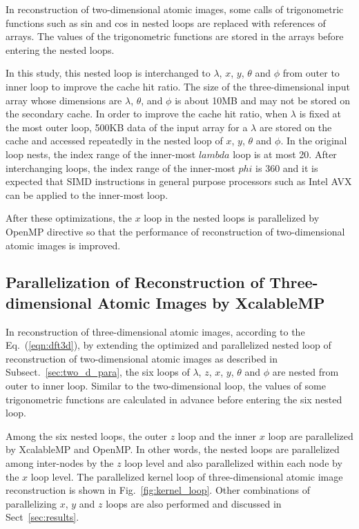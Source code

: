 \documentclass[graybox,vecphys]{svmult}
\begin{document}

In reconstruction of two-dimensional atomic images, some calls of
trigonometric functions such as sin and cos in nested loops are
replaced with references of arrays. The values of the trigonometric
functions are stored in the arrays before entering the nested loops.

In this study, this nested loop is interchanged to $\lambda$, $x$, $y$,
$\theta$ and $\phi$ from outer to inner loop to improve the cache
hit ratio. The size of the three-dimensional input array whose
dimensions are $\lambda$, $\theta$, and $\phi$ is about 10MB and
may not be stored on the secondary cache. In order to improve
the cache hit ratio, when $\lambda$ is fixed at the most outer loop, 
500KB data of the input array for a $\lambda$ are stored on the cache
and accessed repeatedly in the nested loop of $x$, $y$, $\theta$ and $\phi$.
In the original loop nests, the index range of the inner-most $lambda$
loop is at most 20. After interchanging loops, the index range of the
inner-most $phi$ is 360 and it is expected that SIMD instructions in
general purpose processors such as Intel AVX can be applied to the
inner-most loop.

After these optimizations, the $x$ loop in the nested loops is
parallelized by OpenMP directive so that the performance of
reconstruction of two-dimensional atomic images is improved.

\subsection{Parallelization of Reconstruction of Three-dimensional Atomic Images by XcalableMP}\label{sec:three_d_para}
In reconstruction of three-dimensional atomic images, according to the
Eq.~(\ref{eqn:dft3d}), by extending the optimized and parallelized
nested loop of reconstruction of two-dimensional atomic images as
described in Subsect.~\ref{sec:two_d_para}, the six loops of $\lambda$, $z$,
$x$, $y$, $\theta$ and $\phi$ are nested from outer to inner loop.
Similar to the two-dimensional loop, the values of some trigonometric
functions are calculated in advance before entering the six nested
loop.

Among the six nested loops, the outer $z$ loop and the inner $x$ loop
are parallelized by XcalableMP and OpenMP. In other words, the nested
loops are parallelized among inter-nodes by the $z$ loop level and
also parallelized within each node by the $x$ loop level.  The
parallelized kernel loop of three-dimensional atomic image
reconstruction is shown in Fig.~\ref{fig:kernel_loop}.  Other combinations
of parallelizing $x$, $y$ and $z$ loops are also performed and
discussed in Sect~\ref{sec:results}.
\end{document}
